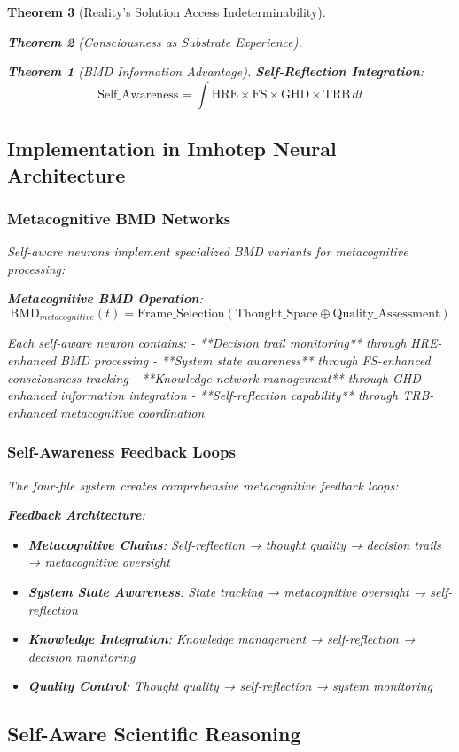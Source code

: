 \documentclass[12pt,a4paper]{article}
\newtheorem{theorem}{Theorem}[section]
\theoremstyle{remark}
\begin{document}
\begin{theorem}[Reality's Solution Access Indeterminability]
\begin{theorem}[Consciousness as Substrate Experience]
\begin{theorem}[BMD Information Advantage]
{\textbf{Self-Reflection Integration}:
$$\text{Self}\_\text{Awareness} = \int \text{HRE} \times \text{FS} \times \text{GHD} \times \text{TRB} \, dt$$

\subsection{Implementation in Imhotep Neural Architecture}

\subsubsection{Metacognitive BMD Networks}

Self-aware neurons implement specialized BMD variants for metacognitive processing:

\textbf{Metacognitive BMD Operation}:
$$\text{BMD}_{metacognitive}(t) = \text{Frame}\_\text{Selection}(\text{Thought}\_\text{Space} \oplus \text{Quality}\_\text{Assessment})$$

Each self-aware neuron contains:
- **Decision trail monitoring** through HRE-enhanced BMD processing
- **System state awareness** through FS-enhanced consciousness tracking  
- **Knowledge network management** through GHD-enhanced information integration
- **Self-reflection capability** through TRB-enhanced metacognitive coordination

\subsubsection{Self-Awareness Feedback Loops}

The four-file system creates comprehensive metacognitive feedback loops:

\textbf{Feedback Architecture}:
\begin{itemize}
\item \textbf{Metacognitive Chains}: Self-reflection → thought quality → decision trails → metacognitive oversight
\item \textbf{System State Awareness}: State tracking → metacognitive oversight → self-reflection
\item \textbf{Knowledge Integration}: Knowledge management → self-reflection → decision monitoring
\item \textbf{Quality Control}: Thought quality → self-reflection → system monitoring
\end{itemize}

\subsection{Self-Aware Scientific Reasoning}

}
\end{theorem}
\end{theorem}
\end{theorem}
\end{document}
